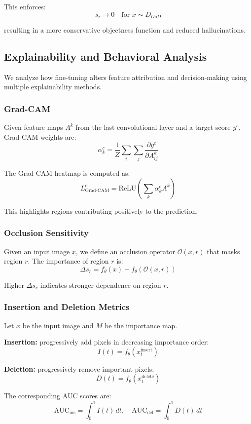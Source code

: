This enforces:
\[
s_i \rightarrow 0 \quad \text{for } x \sim D_{OoD}
\]

resulting in a more conservative objectness function and reduced hallucinations.

\subsection{Explainability and Behavioral Analysis}

We analyze how fine-tuning alters feature attribution and decision-making using multiple explainability methods.

\subsubsection{Grad-CAM}

Given feature maps $A^k$ from the last convolutional layer and a target score $y^c$, Grad-CAM weights are:
\[
\alpha_k^c = \frac{1}{Z} \sum_i \sum_j \frac{\partial y^c}{\partial A_{ij}^k}
\]

The Grad-CAM heatmap is computed as:
\[
L_{\text{Grad-CAM}}^c = \text{ReLU} \left( \sum_k \alpha_k^c A^k \right)
\]

This highlights regions contributing positively to the prediction.

\subsubsection{Occlusion Sensitivity}

Given an input image $x$, we define an occlusion operator $\mathcal{O}(x, r)$ that masks region $r$. The importance of region $r$ is:
\[
\Delta s_r = f_\theta(x) - f_\theta(\mathcal{O}(x, r))
\]

Higher $\Delta s_r$ indicates stronger dependence on region $r$.

\subsubsection{Insertion and Deletion Metrics}

Let $x$ be the input image and $M$ be the importance map.

\textbf{Insertion:} progressively add pixels in decreasing importance order:
\[
I(t) = f_\theta(x_t^{\text{insert}})
\]

\textbf{Deletion:} progressively remove important pixels:
\[
D(t) = f_\theta(x_t^{\text{delete}})
\]

The corresponding AUC scores are:
\[
\text{AUC}_{\text{ins}} = \int_0^1 I(t) \, dt, \quad
\text{AUC}_{\text{del}} = \int_0^1 D(t) \, dt
\]

